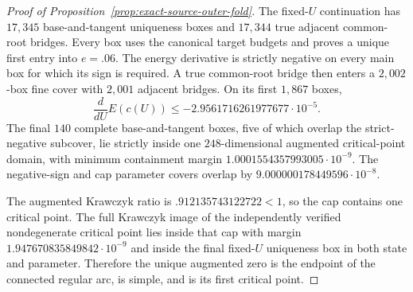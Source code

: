 \documentclass[11pt]{amsart}
\numberwithin{equation}{section}
\theoremstyle{definition}
\theoremstyle{remark}
\begin{document}
\begin{proof}[Proof of Proposition~\ref{prop:exact-source-outer-fold}]
The fixed-$U$ continuation has $17{,}345$ base-and-tangent uniqueness boxes
and $17{,}344$ true adjacent common-root bridges.  Every box uses the
canonical target budgets and proves a unique first entry into $e=.06$.
The energy derivative is strictly negative on every main box for which its
sign is required.  A true common-root bridge then enters a $2{,}002$-box
fine cover with $2{,}001$ adjacent bridges.  On its first $1{,}867$ boxes,
\begin{equation}\label{eq:outer-fold-negative-margin}
 \frac d{dU}E(c(U))\le-2.9561716261977677\cdot10^{-5}.
\end{equation}
The final $140$ complete base-and-tangent boxes, five of which overlap the
strict-negative subcover, lie strictly inside one $248$-dimensional
augmented critical-point domain, with minimum containment margin
$1.0001554357993005\cdot10^{-9}$.  The negative-sign and cap parameter
covers overlap by $9.000000178449596\cdot10^{-8}$.

The augmented Krawczyk ratio is $.912135743122722<1$, so the cap contains
one critical point.  The full Krawczyk image of the independently verified
nondegenerate critical point lies inside that cap with margin
$1.947670835849842\cdot10^{-9}$ and inside the final fixed-$U$ uniqueness
box in both state and parameter.  Therefore the unique augmented zero is
the endpoint of the connected regular arc, is simple, and is its first
critical point.
\end{proof}





\end{document}
